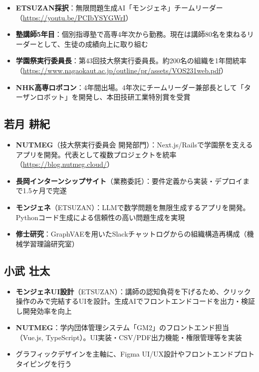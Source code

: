 \documentclass[paper=a4,fontsize=10.5bp,jafontsize=10.5bp,twocolumn]{jlreq}
\begin{document}
\begin{itemize}
  \item \textbf{ETSUZAN採択}：無限問題生成AI「モンジェネ」チームリーダー（\url{https://youtu.be/PCIbYSYGWrI}）
  \item \textbf{塾講師5年目}：個別指導塾で高専4年次から勤務。現在は講師80名を束ねるリーダーとして、生徒の成績向上に取り組む
  \item \textbf{学園祭実行委員長}：第43回技大祭実行委員長。約200名の組織を1年間統率（\url{https://www.nagaokaut.ac.jp/outline/pr/assets/VOS231web.pdf}）
  \item \textbf{NHK高専ロボコン}：4年間出場。4年次にチームリーダー兼部長として「ターザンロボット」を開発し、本田技研工業特別賞を受賞
\end{itemize}

\subsection*{若月 耕紀}

\begin{itemize}
  \item \textbf{NUTMEG}（技大祭実行委員会 開発部門）：Next.js/Railsで学園祭を支えるアプリを開発。代表として複数プロジェクトを統率（\url{https://blog.nutmeg.cloud/}）
  \item \textbf{長岡インターンシップサイト}（業務委託）：要件定義から実装・デプロイまで1.5ヶ月で完遂
  \item \textbf{モンジェネ}（ETSUZAN）：LLMで数学問題を無限生成するアプリを開発。Pythonコード生成による信頼性の高い問題生成を実現
  \item \textbf{修士研究}：GraphVAEを用いたSlackチャットログからの組織構造再構成（機械学習理論研究室）
\end{itemize}

\subsection*{小武 壮太}

\begin{itemize}
  \item \textbf{モンジェネUI設計}（ETSUZAN）：講師の認知負荷を下げるため、クリック操作のみで完結するUIを設計。生成AIでフロントエンドコードを出力・検証し開発効率を向上
  \item \textbf{NUTMEG}：学内団体管理システム「GM2」のフロントエンド担当（Vue.js, TypeScript）。UI実装・CSV/PDF出力機能・権限管理等を実装
  \item グラフィックデザインを主軸に、Figma UI/UX設計やフロントエンドプロトタイピングを行う
\end{itemize}
\end{document}
